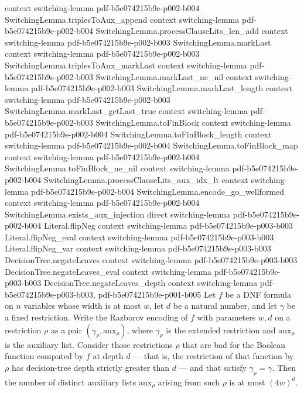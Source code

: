 \begin{lemma}
  {context}
  {switching-lemma}
  {pdf-b5e074215b9e-p002-b004}
\proofstep
  {SwitchingLemma.triplesToAux_append}
  {context}
  {switching-lemma}
  {pdf-b5e074215b9e-p002-b004}
\proofstep
  {SwitchingLemma.processClauseLits_len_add}
  {context}
  {switching-lemma}
  {pdf-b5e074215b9e-p002-b003}
\proofstep
  {SwitchingLemma.markLast}
  {context}
  {switching-lemma}
  {pdf-b5e074215b9e-p002-b003}
\proofstep
  {SwitchingLemma.triplesToAux_markLast}
  {context}
  {switching-lemma}
  {pdf-b5e074215b9e-p002-b003}
\proofstep
  {SwitchingLemma.markLast_ne_nil}
  {context}
  {switching-lemma}
  {pdf-b5e074215b9e-p002-b003}
\proofstep
  {SwitchingLemma.markLast_length}
  {context}
  {switching-lemma}
  {pdf-b5e074215b9e-p002-b003}
\proofstep
  {SwitchingLemma.markLast_getLast_true}
  {context}
  {switching-lemma}
  {pdf-b5e074215b9e-p002-b003}
\proofstep
  {SwitchingLemma.toFinBlock}
  {context}
  {switching-lemma}
  {pdf-b5e074215b9e-p002-b004}
\proofstep
  {SwitchingLemma.toFinBlock_length}
  {context}
  {switching-lemma}
  {pdf-b5e074215b9e-p002-b004}
\proofstep
  {SwitchingLemma.toFinBlock_map}
  {context}
  {switching-lemma}
  {pdf-b5e074215b9e-p002-b004}
\proofstep
  {SwitchingLemma.toFinBlock_ne_nil}
  {context}
  {switching-lemma}
  {pdf-b5e074215b9e-p002-b004}
\proofstep
  {SwitchingLemma.processClauseLits_aux_idx_lt}
  {context}
  {switching-lemma}
  {pdf-b5e074215b9e-p002-b004}
\proofstep
  {SwitchingLemma.encode_go_wellformed}
  {context}
  {switching-lemma}
  {pdf-b5e074215b9e-p002-b004}
\proofstep
  {SwitchingLemma.exists_aux_injection}
  {direct}
  {switching-lemma}
  {pdf-b5e074215b9e-p002-b004}
\proofstep
  {Literal.flipNeg}
  {context}
  {switching-lemma}
  {pdf-b5e074215b9e-p003-b003}
\proofstep
  {Literal.flipNeg_eval}
  {context}
  {switching-lemma}
  {pdf-b5e074215b9e-p003-b003}
\proofstep
  {Literal.flipNeg_var}
  {context}
  {switching-lemma}
  {pdf-b5e074215b9e-p003-b003}
\proofstep
  {DecisionTree.negateLeaves}
  {context}
  {switching-lemma}
  {pdf-b5e074215b9e-p003-b003}
\proofstep
  {DecisionTree.negateLeaves_eval}
  {context}
  {switching-lemma}
  {pdf-b5e074215b9e-p003-b003}
\proofstep
  {DecisionTree.negateLeaves_depth}
  {context}
  {switching-lemma}
  {pdf-b5e074215b9e-p003-b003,
    pdf-b5e074215b9e-p001-b005}
Let $f$ be a DNF formula on $n$ variables whose width is at most $w$, let $d$ be a
natural number, and let $\gamma$ be a fixed restriction. Write the Razborov encoding of
$f$ with parameters $w, d$ on a restriction $\rho$ as a pair $(\gamma_\rho,
\mathrm{aux}_\rho)$, where $\gamma_\rho$ is the extended restriction and
$\mathrm{aux}_\rho$ is the auxiliary list. Consider those restrictions $\rho$ that are
bad for the Boolean function computed by $f$ at depth $d$ — that is, the restriction of
that function by $\rho$ has decision-tree depth strictly greater than $d$ — and that
satisfy $\gamma_\rho = \gamma$. Then the number of distinct auxiliary lists
$\mathrm{aux}_\rho$ arising from such $\rho$ is at most $(4w)^d$.
\end{lemma}

